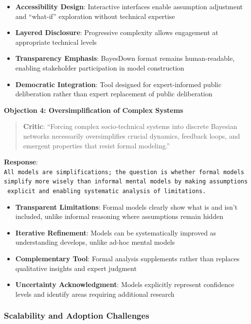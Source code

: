 \documentclass[
  11pt,
  letterpaper,
]{book}
\providecommand{\tightlist}{%
  \setlength{\itemsep}{0pt}\setlength{\parskip}{0pt}}
\begin{document}
\begin{itemize}
\tightlist
\item
  \textbf{Accessibility Design}: Interactive interfaces enable
  assumption adjustment and ``what-if'' exploration without technical
  expertise
\item
  \textbf{Layered Disclosure}: Progressive complexity allows engagement
  at appropriate technical levels
\item
  \textbf{Transparency Emphasis}: BayesDown format remains
  human-readable, enabling stakeholder participation in model
  construction
\item
  \textbf{Democratic Integration}: Tool designed for expert-informed
  public deliberation rather than expert replacement of public
  deliberation
\end{itemize}

\textbf{Objection 4: Oversimplification of Complex Systems}

\begin{quote}
\textbf{Critic}: ``Forcing complex socio-technical systems into discrete
Bayesian networks necessarily oversimplifies crucial dynamics, feedback
loops, and emergent properties that resist formal modeling.''
\end{quote}

\textbf{Response}:
\texttt{All\ models\ are\ simplifications;\ the\ question\ is\ whether\ formal\ models\ simplify\ more\ wisely\ than\ informal\ mental\ models\ by\ making\ assumptions\ explicit\ and\ enabling\ systematic\ analysis\ of\ limitations.}

\begin{itemize}
\tightlist
\item
  \textbf{Transparent Limitations}: Formal models clearly show what is
  and isn't included, unlike informal reasoning where assumptions remain
  hidden
\item
  \textbf{Iterative Refinement}: Models can be systematically improved
  as understanding develops, unlike ad-hoc mental models
\item
  \textbf{Complementary Tool}: Formal analysis supplements rather than
  replaces qualitative insights and expert judgment
\item
  \textbf{Uncertainty Acknowledgment}: Models explicitly represent
  confidence levels and identify areas requiring additional research
\end{itemize}

\subsubsection{Scalability and Adoption
Challenges}\label{sec-scalability-adoption}
\end{document}
